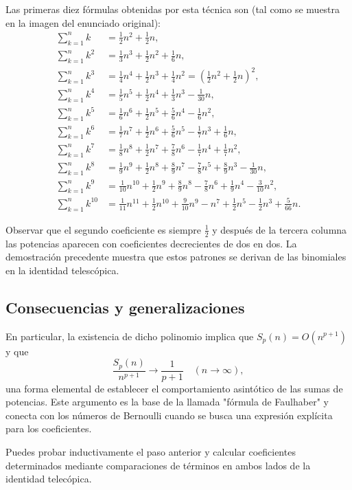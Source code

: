 Las primeras diez fórmulas obtenidas por esta técnica son (tal como se
muestra en la imagen del enunciado original):
\begin{align*}
\sum_{k=1}^n k &= \tfrac12 n^2 + \tfrac12 n, \\
\sum_{k=1}^n k^2 &= \tfrac13 n^3 + \tfrac12 n^2 + \tfrac16 n, \\
\sum_{k=1}^n k^3 &= \tfrac14 n^4 + \tfrac12 n^3 + \tfrac14 n^2 = \left(\tfrac12 n^2 + \tfrac12 n\right)^2, \\
\sum_{k=1}^n k^4 &= \tfrac15 n^5 + \tfrac12 n^4 + \tfrac13 n^3 - \tfrac{1}{30}n, \\
\sum_{k=1}^n k^5 &= \tfrac16 n^6 + \tfrac12 n^5 + \tfrac56 n^4 - \tfrac16 n^2, \\
\sum_{k=1}^n k^6 &= \tfrac17 n^7 + \tfrac12 n^6 + \tfrac56 n^5 - \tfrac17 n^3 + \tfrac16 n, \\
\sum_{k=1}^n k^7 &= \tfrac18 n^8 + \tfrac12 n^7 + \tfrac78 n^6 - \tfrac17 n^4 + \tfrac17 n^2, \\
\sum_{k=1}^n k^8 &= \tfrac19 n^9 + \tfrac12 n^8 + \tfrac89 n^7 - \tfrac78 n^5 + \tfrac89 n^3 - \tfrac{1}{30}n, \\
\sum_{k=1}^n k^9 &= \tfrac1{10} n^{10} + \tfrac12 n^9 + \tfrac89 n^8 - \tfrac78 n^6 + \tfrac19 n^4 - \tfrac3{10} n^2, \\
\sum_{k=1}^n k^{10} &= \tfrac1{11} n^{11} + \tfrac12 n^{10} + \tfrac9{10} n^9 - n^7 + \tfrac12 n^5 - \tfrac1{2}n^3 + \tfrac5{66}n.
\end{align*}

Observar que el segundo coeficiente es siempre $\tfrac12$ y después de la
tercera columna las potencias aparecen con coeficientes decrecientes de dos
en dos. La demostración precedente muestra que estos patrones se derivan de
las binomiales en la identidad telescópica.

\subsection*{Consecuencias y generalizaciones}

En particular, la existencia de dicho polinomio implica que
$S_p(n)=O(n^{p+1})$ y que
\[
\frac{S_p(n)}{n^{p+1}}\to \frac{1}{p+1} \quad(n\to\infty),
\]
una forma elemental de establecer el comportamiento asintótico de las
sumas de potencias. Este argumento es la base de la llamada "fórmula de
Faulhaber" y conecta con los números de Bernoulli cuando se busca una
expresión explícita para los coeficientes.

\vspace{1em}
Puedes probar inductivamente el paso anterior y calcular coeficientes
determinados mediante comparaciones de términos en ambos lados de la identidad
telecópica.

